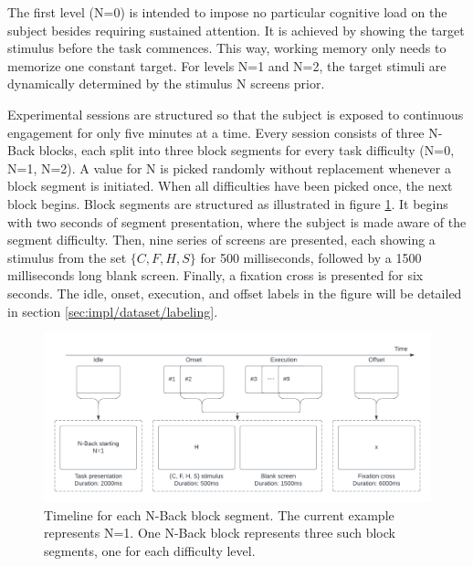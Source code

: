 The first level (N=0) is intended to impose no particular cognitive load on the subject besides requiring sustained attention. It is achieved by showing the target stimulus before the task commences. This way, working memory only needs to memorize one constant target. For levels N=1 and N=2, the target stimuli are dynamically determined by the stimulus N screens prior.

Experimental sessions are structured so that the subject is exposed to continuous engagement for only five minutes at a time. Every session consists of three N-Back blocks, each split into three block segments for every task difficulty (N=0, N=1, N=2). A value for N is picked randomly without replacement whenever a block segment is initiated. When all difficulties have been picked once, the next block begins. Block segments are structured as illustrated in figure \ref{fig:impl/NBackBlockSeg}. It begins with two seconds of segment presentation, where the subject is made aware of the segment difficulty. Then, nine series of screens are presented, each showing a stimulus from the set $\{C, F, H, S\}$ for 500 milliseconds, followed by a 1500 milliseconds long blank screen. Finally, a fixation cross is presented for six seconds. The idle, onset, execution, and offset labels in the figure will be detailed in section \ref{sec:impl/dataset/labeling}.


\begin{figure}[h]
    \centering
    \includegraphics[width=\textwidth]{figures/impl_NBackBlock.png}
    \caption{Timeline for each N-Back block segment. The current example represents N=1. One N-Back block represents three such block segments, one for each difficulty level.}
    \label{fig:impl/NBackBlockSeg}
\end{figure}


